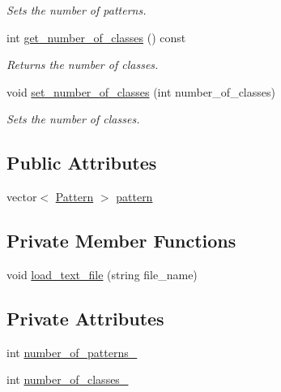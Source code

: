 \begin{DoxyCompactItemize}
\begin{DoxyCompactList}\small\item\em Sets the number of patterns. \end{DoxyCompactList}\item 
int \hyperlink{classPatterns_aea4f00f4ee4d22876ac8f6850098c3e1}{get\+\_\+number\+\_\+of\+\_\+classes} () const 
\begin{DoxyCompactList}\small\item\em Returns the number of classes. \end{DoxyCompactList}\item 
void \hyperlink{classPatterns_adcfd5d41467f7174f12c139adcbea384}{set\+\_\+number\+\_\+of\+\_\+classes} (int number\+\_\+of\+\_\+classes)
\begin{DoxyCompactList}\small\item\em Sets the number of classes. \end{DoxyCompactList}\end{DoxyCompactItemize}
\subsection*{Public Attributes}
\begin{DoxyCompactItemize}
\item 
vector$<$ \hyperlink{classPattern}{Pattern} $>$ \hyperlink{classPatterns_ada129f464f3a816c5658f441f8c937ce}{pattern}
\end{DoxyCompactItemize}
\subsection*{Private Member Functions}
\begin{DoxyCompactItemize}
\item 
void \hyperlink{classPatterns_a33f921ea55ac9c731f6d15ffaa3b346e}{load\+\_\+text\+\_\+file} (string file\+\_\+name)
\end{DoxyCompactItemize}
\subsection*{Private Attributes}
\begin{DoxyCompactItemize}
\item 
int \hyperlink{classPatterns_ad26e3821e74fa46efdac09df9ca0f72a}{number\+\_\+of\+\_\+patterns\+\_\+}
\item 
int \hyperlink{classPatterns_aab8d09618ac4738672d7dfce0d462662}{number\+\_\+of\+\_\+classes\+\_\+}
\end{DoxyCompactItemize}
